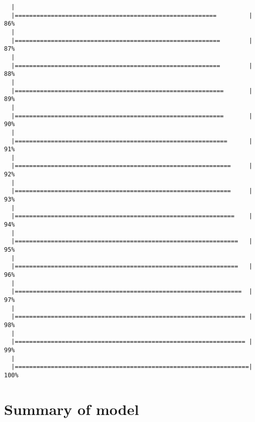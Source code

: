 \documentclass[]{article}
\begin{document}
\begin{verbatim}
  |                                                                       
  |========================================================         |  86%
  |                                                                       
  |=========================================================        |  87%
  |                                                                       
  |=========================================================        |  88%
  |                                                                       
  |==========================================================       |  89%
  |                                                                       
  |==========================================================       |  90%
  |                                                                       
  |===========================================================      |  91%
  |                                                                       
  |============================================================     |  92%
  |                                                                       
  |============================================================     |  93%
  |                                                                       
  |=============================================================    |  94%
  |                                                                       
  |==============================================================   |  95%
  |                                                                       
  |==============================================================   |  96%
  |                                                                       
  |===============================================================  |  97%
  |                                                                       
  |================================================================ |  98%
  |                                                                       
  |================================================================ |  99%
  |                                                                       
  |=================================================================| 100%
\end{verbatim}

\hypertarget{summary-of-model}{%
\section{Summary of model}\label{summary-of-model}}
\end{document}
